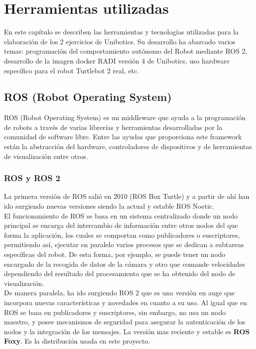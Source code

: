 \chapter{Herramientas utilizadas}
\label{cap:capitulo3}

En este capítulo se describen las herramientas y tecnologías utilizadas para la elaboración de los 2 ejercicios de Unibotics. Su desarrollo ha abarcado varios temas: programación del comportamiento autónomo del Robot mediante ROS 2, desarrollo de la imagen docker RADI versión 4 de Unibotics, uso hardware específico para el robot Turtlebot 2 real, etc.\\

\section{ROS (Robot Operating System)}
\label{sec:ros}
ROS (Robot Operating System) es un middleware que ayuda a la programación de robots a través de varias librerías y herramientas desarrolladas por la comunidad de software libre. Entre las ayudas que proporciona este framework están la abstracción del hardware, controladores de dispositivos y de herramientas de visualización entre otros.\\

\subsection {ROS y ROS 2}
\label{sec:ros_versions}
La primera versión de ROS salió en 2010 (ROS Box Turtle) y a partir de ahí han ido surgiendo nuevas versiones siendo la actual y estable ROS Noetic.\\

El funcionamiento de ROS se basa en un sistema centralizado donde un nodo principal se encarga del intercambio de información entre otros nodos del que forma la aplicación, los cuales se comportan como publicadores o suscriptores, permitiendo así, ejecutar en paralelo varios procesos que se dedican a subtareas específicas del robot. De esta forma, por ejemplo, se puede tener un nodo encargado de la recogida de datos de la cámara y otro que comande velocidades dependiendo del resultado del procesamiento que se ha obtenido del nodo de visualización.\\

De manera paralela, ha ido surgiendo ROS 2 que es una versión en auge que incorpora nuevas características y novedades en cuanto a su uso. Al igual que en ROS se basa en publicadores y suscriptores, sin embargo, no usa un nodo maestro, y posee mecanismos de seguridad para asegurar la autenticación de los nodos y la integración de los mensajes. La versión mas reciente y estable es \textbf{ROS Foxy}. Es la distribución usada en este proyecto.\\

